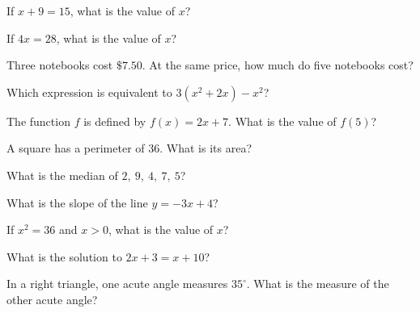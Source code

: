 \begin{exo}[Algebra]{}
If $x+9=15$, what is the value of $x$?
\end{exo}
\begin{exo}[Algebra]{}
If $4x=28$, what is the value of $x$?
\end{exo}
\begin{exo}{}
Three notebooks cost $\$7.50$. At the same price, how much do five notebooks cost?
\end{exo}
\begin{exo}{}
Which expression is equivalent to $3(x^2+2x)-x^2$?
\end{exo}
\begin{exo}[Algebra]{\sprtag}
The function $f$ is defined by $f(x)=2x+7$. What is the value of $f(5)$?
\end{exo}
\begin{exo}{}
A square has a perimeter of 36. What is its area?
\end{exo}
\begin{exo}{}
What is the median of $2,\ 9,\ 4,\ 7,\ 5$?
\end{exo}
\begin{exo}[Algebra]{}
What is the slope of the line $y=-3x+4$?
\end{exo}
\begin{exo}{}
If $x^2=36$ and $x>0$, what is the value of $x$?
\end{exo}
\begin{exo}[Algebra]{\sprtag}
What is the solution to $2x+3=x+10$?
\end{exo}
\begin{exo}{}
In a right triangle, one acute angle measures $35^\circ$. What is the measure of the other acute angle?
\end{exo}
